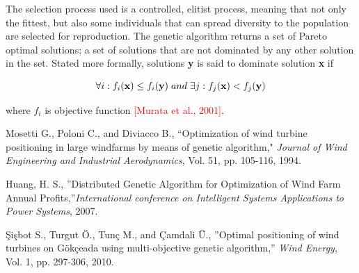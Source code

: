 \documentclass{article}
\begin{document}
The selection process used is a controlled, elitist process, meaning that not only the fittest, but also some individuals that can spread diversity to the population are selected for reproduction. The genetic algorithm returns a set of Pareto optimal solutions; a set of solutions that are not dominated by any other solution in the set. Stated more formally, solutions \textbf{y} is said to dominate solution \textbf{x} if

\begin{equation}
\forall i: f_i(\textbf{x}) \leq f_i(\textbf{y}) \hspace{1mm} and \hspace{1mm} \exists j: f_j(\textbf{x}) < f_j(\textbf{y}) 
\label{Dominated solutions}
\end{equation}

where $f_i$ is objective function \textcolor{red}{[Murata et al., 2001]}.

\begin{thebibliography}{100} %

 Mosetti G., Poloni C., and Diviacco B., ``Optimization of wind turbine positioning in large windfarms by means of genetic algorithm," \emph{Journal of Wind Engineering and Industrial Aerodynamics}, Vol. 51, pp. 105-116, 1994.

 Huang, H. S., ''Distributed Genetic Algorithm for Optimization of Wind Farm Annual Profits,''\emph{International conference on Intelligent Systems Applications to Power Systems}, 2007.

 \c{S}i\c{s}bot S., Turgut {\"O}., Tun\c{c} M., and \c{C}amdali {\"U}., ''Optimal positioning of wind turbines on G{\"o}k\c{c}eada using multi-objective genetic algorithm,'' \emph{Wind Energy}, Vol. 1, pp. 297-306, 2010.

\end{thebibliography}
\end{document}
